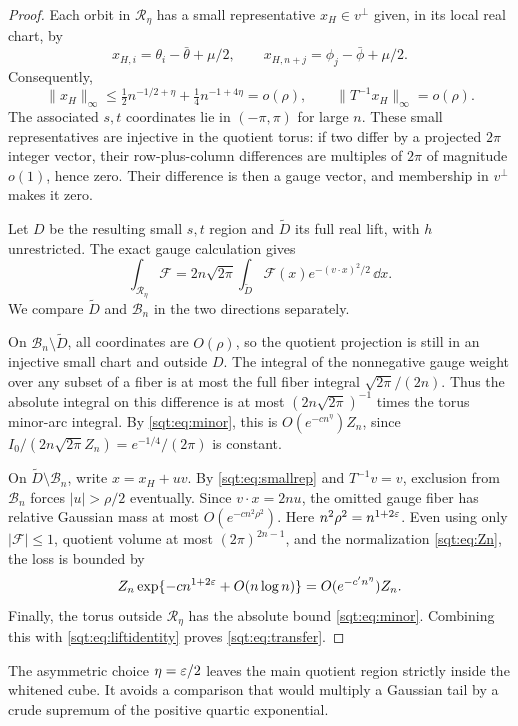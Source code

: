 \begin{proof}
Each orbit in $\mathcal R_\eta$ has a small representative $x_H\in v^\perp$ given, in its local real chart, by
\[
x_{H,i}=\theta_i-\bar\theta+\mu/2,\qquad
x_{H,n+j}=\phi_j-\bar\phi+\mu/2.
\]
Consequently,
\begin{equation}\label{sqt:eq:smallrep}
\|x_H\|_\infty\leq\tfrac12n^{-1/2+\eta}+\tfrac14n^{-1+4\eta}=o(\rho),
\qquad \|T^{-1}x_H\|_\infty=o(\rho).
\end{equation}
The associated $s,t$ coordinates lie in $(-\pi,\pi)$ for large $n$. These small representatives are injective in the quotient torus: if two differ by a projected $2\pi$ integer vector, their row-plus-column differences are multiples of $2\pi$ of magnitude $o(1)$, hence zero. Their difference is then a gauge vector, and membership in $v^\perp$ makes it zero.

Let $D$ be the resulting small $s,t$ region and $\widetilde D$ its full real lift, with $h$ unrestricted. The exact gauge calculation gives
\begin{equation}\label{sqt:eq:liftidentity}
\int_{\mathcal R_\eta}\mathcal F
 =2n\sqrt{2\pi}\int_{\widetilde D}\mathcal F(x)e^{-(v\cdot x)^2/2}\,\dd x.
\end{equation}
We compare $\widetilde D$ and $\mathcal B_n$ in the two directions separately.

On $\mathcal B_n\setminus\widetilde D$, all coordinates are $O(\rho)$, so the quotient projection is still in an injective small chart and outside $D$. The integral of the nonnegative gauge weight over any subset of a fiber is at most the full fiber integral $\sqrt{2\pi}/(2n)$. Thus the absolute integral on this difference is at most $(2n\sqrt{2\pi})^{-1}$ times the torus minor-arc integral. By \eqref{sqt:eq:minor}, this is $O(e^{-c n^\eta})Z_n$, since $I_0/(2n\sqrt{2\pi}Z_n)=e^{-1/4}/(2\pi)$ is constant.

On $\widetilde D\setminus\mathcal B_n$, write $x=x_H+uv$. By \eqref{sqt:eq:smallrep} and $T^{-1}v=v$, exclusion from $\mathcal B_n$ forces $|u|>\rho/2$ eventually. Since $v\cdot x=2nu$, the omitted gauge fiber has relative Gaussian mass at most $O(e^{-c n^2\rho^2})$. Here $n^2\rho^2=n^{1+2\varepsilon}$. Even using only $|\mathcal F|\leq1$, quotient volume at most $(2\pi)^{2n-1}$, and the normalization \eqref{sqt:eq:Zn}, the loss is bounded by
\[
Z_n\exp\{-c n^{1+2\varepsilon}+O(n\log n)\}
 =O(e^{-c' n^\eta})Z_n.
\]
Finally, the torus outside $\mathcal R_\eta$ has the absolute bound \eqref{sqt:eq:minor}. Combining this with \eqref{sqt:eq:liftidentity} proves \eqref{sqt:eq:transfer}.
\end{proof}

The asymmetric choice $\eta=\varepsilon/2$ leaves the main quotient region strictly inside the whitened cube. It avoids a comparison that would multiply a Gaussian tail by a crude supremum of the positive quartic exponential.
